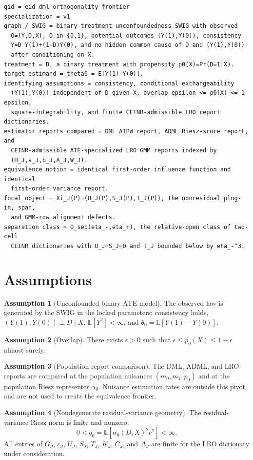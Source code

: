 \documentclass[11pt]{article}
\newcommand{\E}{\mathbb{E}}
\theoremstyle{definition}
\newtheorem{assumption}{Assumption}
\theoremstyle{plain}
\theoremstyle{remark}
\begin{document}
\begin{verbatim}
qid = eid_dml_orthogonality_frontier
specialization = v1
graph / SWIG = binary-treatment unconfoundedness SWIG with observed
  O=(Y,D,X), D in {0,1}, potential outcomes (Y(1),Y(0)), consistency
  Y=D Y(1)+(1-D)Y(0), and no hidden common cause of D and (Y(1),Y(0))
  after conditioning on X.
treatment = D, a binary treatment with propensity p0(X)=Pr(D=1|X).
target estimand = theta0 = E[Y(1)-Y(0)].
identifying assumptions = consistency, conditional exchangeability
  (Y(1),Y(0)) independent of D given X, overlap epsilon <= p0(X) <= 1-epsilon,
  square-integrability, and finite CEINR-admissible LRO report dictionaries.
estimator reports compared = DML AIPW report, ADML Riesz-score report, and
  CEINR-admissible ATE-specialized LRO GMM reports indexed by
  (H_J,a_J,b_J,A_J,W_J).
equivalence notion = identical first-order influence function and identical
  first-order variance report.
focal object = Xi_J(P)=(U_J(P),S_J(P),T_J(P)), the nonresidual plug-in, span,
  and GMM-row alignment defects.
separation class = O_sep(eta_-,eta_+), the relative-open class of two-cell
  CEINR dictionaries with U_J=S_J=0 and T_J bounded below by eta_-^3.
\end{verbatim}

\section{Assumptions}
\begin{assumption}[Unconfounded binary ATE model]\label{ass:ate-model}
The observed law is generated by the SWIG in the locked parameters:
consistency holds, \((Y(1),Y(0))\perp D\mid X\), \(\E[Y^2]<\infty\), and
\(\theta_0=\E[Y(1)-Y(0)]\).
\end{assumption}

\begin{assumption}[Overlap]\label{ass:overlap}
There exists \(\epsilon>0\) such that
\(\epsilon\le p_0(X)\le1-\epsilon\) almost surely.
\end{assumption}

\begin{assumption}[Population report comparison]\label{ass:population-report}
The DML, ADML, and LRO reports are compared at the population nuisances
\((m_0,m_1,p_0)\) and at the population Riesz representer \(\alpha_0\).  Nuisance
estimation rates are outside this pivot and are not used to create the
equivalence frontier.
\end{assumption}

\begin{assumption}[Nondegenerate residual-variance geometry]\label{ass:nondegenerate}
The residual-variance Riesz norm is finite and nonzero:
\[
0<q_0=\E[\alpha_0(D,X)^2e^2]<\infty.
\]
All entries of \(G_J\), \(c_J\), \(U_J\), \(S_J\), \(T_J\), \(K_J\), \(C_J\), and
\(\Delta_J\) are finite for the LRO dictionary under consideration.
\end{assumption}
\end{document}
